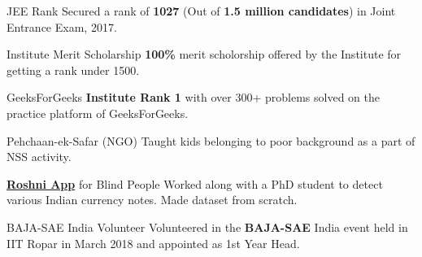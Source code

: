 
\begin{misc}

    \cvskill
    {JEE Rank} %
    {{Secured a rank of }\textbf{1027} { (Out of \textbf{1.5 million candidates}) }{in Joint Entrance Exam, 2017.}}
 
\cvskill
    {Institute Merit Scholarship} %
    {{\textbf{100\%} merit scholorship offered by the Institute for getting a rank under 1500.}}

    \cvskill
    {GeeksForGeeks} %
    {{\textbf{Institute Rank 1} with over 300+ problems solved on the practice platform of GeeksForGeeks.}}

\cvskill
{Pehchaan-ek-Safar (NGO)} %
{{Taught kids belonging to poor background as a part of NSS activity.}}

\cvskill
    {\href{https://www.digit.in/news/apps/roshni-an-android-app-to-help-the-visually-impaired-recognize-currency-notes-46026.html}{\textbf{Roshni App}} for Blind People} %
    {{Worked along with a PhD student to detect various Indian currency notes. Made dataset from scratch.}}


\cvskill
    {BAJA-SAE India Volunteer} %
    {{Volunteered in the \textbf{BAJA-SAE} India event held in IIT Ropar in March 2018 and appointed as 1st Year Head.}}



\end{misc}
